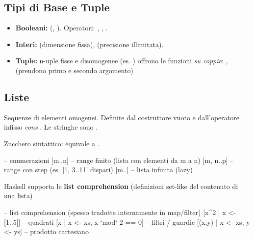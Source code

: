 \subsection{Tipi di Base e Tuple}
\begin{itemize}
    \item \textbf{Booleani:}  (, ). Operatori: , \code{\&\&}, \code{||}.
    \item \textbf{Interi:}  (dimensione fissa),  (precisione illimitata).
    \item \textbf{Tuple:} n-uple fisse e disomogenee (es. )
        \subitem offrono le funzioni \textit{su coppie}: ,  (prendono primo e secondo argomento)
\end{itemize}

\subsection{Liste}
Sequenze di elementi omogenei. Definite dal costruttore vuoto \code{[]} e dall'operatore infisso \textit{cons} \code{(:)}. Le stringhe sono \code{[Char]}. 

Zucchero sintattico: \code{[1,2,3]} equivale a .

\begin{haskellbox}{}
-- enumerazioni 
[m..n]           -- range finito (lista con elementi da m a n)
[m, n..p]        -- range con step (es. [1, 3..11] dispari)
[m..]            -- lista infinita (lazy)

\end{haskellbox}
Haskell supporta le \textbf{list comprehension} (definizioni set-like del contenuto di una lista)

\begin{haskellbox}{}
-- list comprehension (spesso tradotte internamente in map/filter)
[x^2 | x <- [1..5]]               -- quadrati
[x | x <- xs, x `mod` 2 == 0]     -- filtri / guardie
[(x,y) | x <- xs, y <- ys]        -- prodotto cartesiano
\end{haskellbox}

